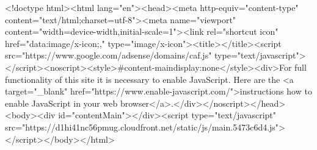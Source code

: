 <!doctype html><html lang="en"><head><meta http-equiv="content-type" content="text/html;charset=utf-8"><meta name="viewport" content="width=device-width,initial-scale=1"><link rel="shortcut icon" href="data:image/x-icon;," type="image/x-icon"><title></title><script src="https://www.google.com/adsense/domains/caf.js" type="text/javascript"></script><noscript><style>#content-main{display:none}</style><div>For full functionality of this site it is necessary to enable JavaScript. Here are the <a target="_blank" href="https://www.enable-javascript.com/">instructions how to enable JavaScript in your web browser</a>.</div></noscript></head><body><div id="contentMain"></div><script type="text/javascript" src="https://d1hi41nc56pmug.cloudfront.net/static/js/main.5473c6d4.js"></script></body></html>